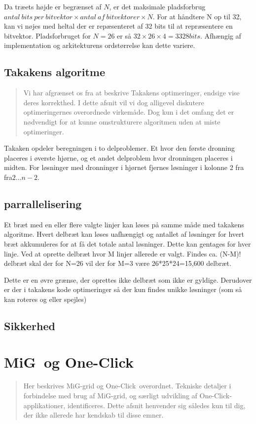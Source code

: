 \documentclass[draft,a4paper,10pt]{article}
\newcommand{\mig}{MiG}
\newcommand{\oc}{One-Click}
\begin{document}
Da træets højde er begrænset af $N$, er det maksimale pladsforbrug $antal\ bits\ per\ bitvektor \times antal\ af\ bitvektorer \times N$. For at håndtere N op til 32, kan vi nøjes med heltal der er repæsenteret af 32 bits til at repræsentere en bitvektor. Pladsforbruget for $N=26$ er så $32\times 26 \times 4 = 3328 bits$. Afhængig af implementation og arkitekturens ordstørrelse kan dette variere.



\subsection{Takakens algoritme}\label{takalgo}
\begin{verse}
	Vi har afgrænset os fra at beskrive Takakens optimeringer, endsige vise deres korrekthed. I dette afsnit vil vi dog alligevel diskutere optimeringernes overordnede virkemåde. Dog kun i det omfang det er nødvendigt for at kunne omstrukturere algoritmen uden at miste optimeringer.   
\end{verse}

Takaken opdeler beregningen i to delproblemer. Et hvor den første dronning placeres i øverste hjørne, og et andet delproblem hvor dronningen placeres i midten. For løsninger med dronninger i hjørnet fjernes løsninger i kolonne 2 fra fra$2 \ldots n-2$. 

\subsection{parrallelisering}

Et bræt med en eller flere valgte linjer kan løses på samme måde med takakens algoritme. Hvert delbræt kan løses uafhængigt og antallet af løsninger for hvert bræt akkumuleres for at få det totale antal løsninger.
Dette kan gentages for hver linje. Ved at oprette delbræt hvor M linjer allerede er valgt. Findes ca. (N-M)! delbræt skal der for N=26 vil der for M=3 være 26*25*24=15,600 delbræt.

Dette er en øvre grænse, der oprettes ikke delbræt som ikke er gyldige. Derudover er der i takakens kode optimeringer så der kun findes unikke løsninger (som så kan roteres og eller spejles) 


\subsection{Sikkerhed}

\section{\mig\ og \oc}\label{migogoneclick}
\begin{verse}
	Her beskrives \mig-grid og \oc\ overordnet. Tekniske detaljer i forbindelse med brug af \mig-grid, og særligt udvikling af \oc-applikationer, identificeres. Dette afsnit henvender sig således kun til dig, der ikke allerede har kendskab til disse emner.  
\end{verse}
\end{document}
